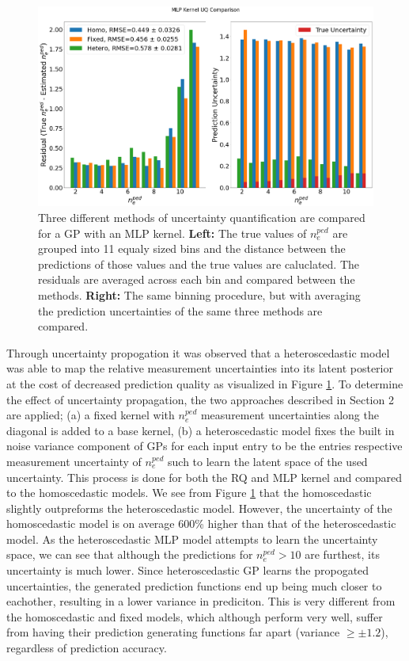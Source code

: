 \documentclass[a4paper, twoside, final, 12pt]{article}
\begin{document}
{\begin{figure}[H]\centering
		\includegraphics[scale=0.25]{./src/MLP_uq_compare}
		\caption{Three different methods of uncertainty quantification are compared for a GP with an MLP kernel. \textbf{Left:} The true values of $n_e^{ped}$ are grouped into 11 equaly sized bins and the distance between the predictions of those values and the true values are caluclated. The residuals are averaged across each bin and compared between the methods. \textbf{Right:} The same binning procedure, but with averaging the prediction uncertainties of the same three methods are compared.}
	\label{fig:MLP_UQ}
\end{figure}

Through uncertainty propogation it was observed that a heteroscedastic model was able to map the relative measurement uncertainties into its latent posterior at the cost of decreased prediction quality as visualized in Figure \ref{fig:MLP_UQ}. 
To determine the effect of uncertainty propagation, the two approaches described in Section 2 are applied; (a) a fixed kernel with $n_e^{ped}$ measurement uncertainties along the diagonal is added to a base kernel, (b) a heteroscedastic model fixes the built in noise variance component of GPs for each input entry to be the entries respective measurement uncertainty of $n_e^{ped}$ such to learn the latent space of the used uncertainty. This process is done for both the RQ and MLP kernel and compared to the homoscedastic models.
We see from Figure \ref{fig:MLP_UQ} that the homoscedastic slightly outpreforms the heteroscedastic model. However, the uncertainty of the homoscedastic model is on average 600\% higher than that of the heteroscedastic model. As the heteroscedastic MLP model attempts to learn the uncertainty space, we can see that although the predictions for $n_e^{ped} > 10$ are furthest, its uncertainty is much lower. Since heteroscedastic GP learns the propogated uncertainties, the generated prediction functions end up being much closer to eachother, resulting in a lower variance in prediciton. This is very different from the homoscedastic and fixed models, which although perform very well, suffer from having their prediction generating functions far apart (variance $ \geq \pm 1.2$), regardless of prediction accuracy.




}
\end{document}
